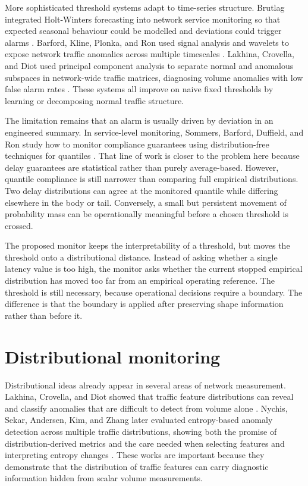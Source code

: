 More sophisticated threshold systems adapt to time-series structure. Brutlag integrated Holt-Winters forecasting into network service monitoring so that expected seasonal behaviour could be modelled and deviations could trigger alarms \cite{brutlagAberrant}. Barford, Kline, Plonka, and Ron used signal analysis and wavelets to expose network traffic anomalies across multiple timescales \cite{barfordSignalAnalysis}. Lakhina, Crovella, and Diot used principal component analysis to separate normal and anomalous subspaces in network-wide traffic matrices, diagnosing volume anomalies with low false alarm rates \cite{lakhinaDiagnosing}. These systems all improve on naive fixed thresholds by learning or decomposing normal traffic structure.

The limitation remains that an alarm is usually driven by deviation in an engineered summary. In service-level monitoring, Sommers, Barford, Duffield, and Ron study how to monitor compliance guarantees using distribution-free techniques for quantiles \cite{sommersSla}. That line of work is closer to the problem here because delay guarantees are statistical rather than purely average-based. However, quantile compliance is still narrower than comparing full empirical distributions. Two delay distributions can agree at the monitored quantile while differing elsewhere in the body or tail. Conversely, a small but persistent movement of probability mass can be operationally meaningful before a chosen threshold is crossed.

The proposed monitor keeps the interpretability of a threshold, but moves the threshold onto a distributional distance. Instead of asking whether a single latency value is too high, the monitor asks whether the current stopped empirical distribution has moved too far from an empirical operating reference. The threshold is still necessary, because operational decisions require a boundary. The difference is that the boundary is applied after preserving shape information rather than before it.

\section{Distributional monitoring}

Distributional ideas already appear in several areas of network measurement. Lakhina, Crovella, and Diot showed that traffic feature distributions can reveal and classify anomalies that are difficult to detect from volume alone \cite{lakhinaDistributions}. Nychis, Sekar, Andersen, Kim, and Zhang later evaluated entropy-based anomaly detection across multiple traffic distributions, showing both the promise of distribution-derived metrics and the care needed when selecting features and interpreting entropy changes \cite{nychisEntropy}. These works are important because they demonstrate that the distribution of traffic features can carry diagnostic information hidden from scalar volume measurements.

